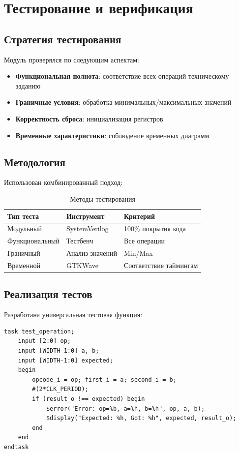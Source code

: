 \documentclass[a4paper,12pt]{article}
\begin{document}
\section{Тестирование и верификация}

\subsection{Стратегия тестирования}
Модуль проверялся по следующим аспектам:
\begin{itemize}
    \item \textbf{Функциональная полнота}: соответствие всех операций техническому заданию
    \item \textbf{Граничные условия}: обработка минимальных/максимальных значений
    \item \textbf{Корректность сброса}: инициализация регистров
    \item \textbf{Временные характеристики}: соблюдение временных диаграмм
\end{itemize}

\subsection{Методология}
Использован комбинированный подход:

\begin{table}[h]
\centering
\caption{Методы тестирования}
\begin{tabular}{|l|l|l|}
\hline
\textbf{Тип теста} & \textbf{Инструмент} & \textbf{Критерий} \\ \hline
Модульный & SystemVerilog & 100\% покрытия кода \\ \hline
Функциональный & Тестбенч & Все операции \\ \hline
Граничный & Анализ значений & Min/Max \\ \hline
Временной & GTKWave & Соответствие таймингам \\ \hline
\end{tabular}
\end{table}

\subsection{Реализация тестов}
Разработана универсальная тестовая функция:

\begin{lstlisting}[style=verilog, caption=Функция автоматического тестирования]
task test_operation;
    input [2:0] op;
    input [WIDTH-1:0] a, b;
    input [WIDTH-1:0] expected;
    begin
        opcode_i = op; first_i = a; second_i = b;
        #(2*CLK_PERIOD);
        if (result_o !== expected) begin
            $error("Error: op=%b, a=%h, b=%h", op, a, b);
            $display("Expected: %h, Got: %h", expected, result_o);
        end
    end
endtask
\end{lstlisting}
\end{document}

